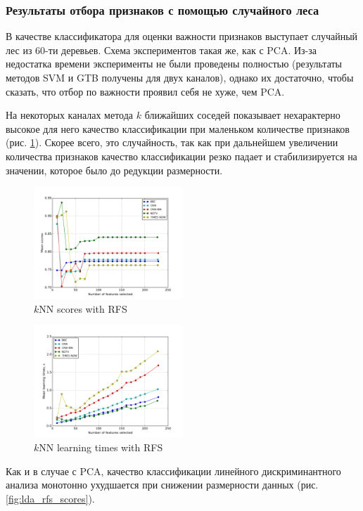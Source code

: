 \subsubsection*{Результаты отбора признаков с помощью случайного леса}
В качестве классификатора для оценки важности признаков выступает случайный лес из 60-ти деревьев. Схема экспериментов такая же, как с PCA. Из-за недостатка времени эксперименты не были проведены полностью (результаты методов SVM и GTB получены для двух каналов), однако их достаточно, чтобы сказать, что отбор по важности проявил себя не хуже, чем PCA.
\par
На некоторых каналах метода \(k\) ближайших соседей показывает нехарактерно высокое для него качество классификации при маленьком количестве признаков (рис. \ref{fig:knn_rfs_scores}). Скорее всего, это случайность, так как при дальнейшем увеличении количества признаков качество классификации резко падает и стабилизируется на значении, которое было до редукции размерности.
\begin{figure}[h!]
    \centering
    \includegraphics[width=0.5\textwidth]{images/RFS-kNN.png}
    \caption{\(k\)NN scores with RFS}
    \label{fig:knn_rfs_scores}
\end{figure} 
\begin{figure}[h!]
    \centering
    \includegraphics[width=0.5\textwidth]{images/RFS-kNNTime.png}
    \caption{\(k\)NN learning times with RFS}
    \label{fig:knn_rfs_times}
\end{figure} 

\par
Как и в случае с PCA, качество классификации линейного дискриминантного анализа монотонно ухудшается при снижении размерности данных (рис. \ref{fig:lda_rfs_scores}).

